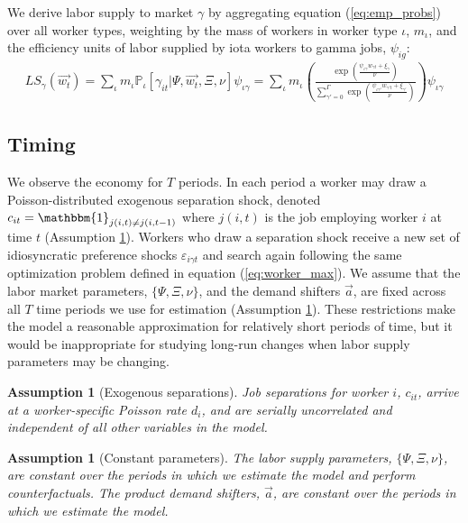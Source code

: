 \documentclass[12pt]{article}
\def\ig{\iota\gamma}
\def\g{\gamma}
\def\i{\iota}
\renewcommand{\P}{\mathbb {P}}
\theoremstyle{definition}
\theoremstyle{plain}
\newtheorem{assumption}[theorem]{Assumption}
\def\ve{\varepsilon}
\begin{document}
We derive labor supply to market $\g$ by aggregating equation (\ref{eq:emp_probs}) over all worker types, weighting by the mass of workers in worker type $\i$, $m_{\i}$, and the efficiency units of labor supplied by iota workers to gamma jobs, $\psi_{ig}$:
\begin{align}
LS_{\g}(\vec{w_t}) = \sum_{\i} m_{\i} \P_{\i}[\g_{it}|\Psi,\vec{w_t},\Xi,\nu] \psi_{\ig} = \sum_{\i} m_{\i} \left( \frac{\exp \left( \frac{\psi_{\ig} w_{\g t} + \xi_{\g}}{\nu} \right) }{ \sum\limits_{\g'=0}^{\Gamma} \exp \left( \frac{\psi_{\ig'} w_{\g' t} + \xi_{\g'}}{\nu} \right) } \right) \psi_{\ig} \label{eq:labor_supply}
\end{align}%


\subsection{Timing}

We observe the economy for $T$ periods.  In each period a worker may draw a Poisson-distributed exogenous separation shock, denoted $c_{it} = \mathbbm{1}_{j(i,t)\neq j(i,t-1)}$ where $j(i,t)$ is the job employing worker $i$ at time $t$ (Assumption \ref{ass:mobility}). Workers who draw a separation shock receive a new set of idiosyncratic preference shocks $\ve_{i\g t}$ and search again following the same optimization problem defined in equation (\ref{eq:worker_max}). We assume that the labor market parameters, $\{\Psi, \Xi, \nu\}$, and the demand shifters $\vec{a}$, are fixed across all $T$ time periods we use for estimation (Assumption \ref{ass:constant_parameters}). These restrictions make the model a reasonable approximation for relatively short periods of time, but it would be inappropriate for studying long-run changes when labor supply parameters may be changing.

\begin{assumption}[Exogenous separations]
	\label{ass:mobility}
	Job separations for worker $i$, $c_{it}$, arrive at a worker-specific Poisson rate $d_i$, and are serially uncorrelated and independent of all other variables in the model. 
\end{assumption}

\begin{assumption}[Constant parameters]
	\label{ass:constant_parameters}
	The labor supply parameters, $\{\Psi, \Xi, \nu\}$, are constant over the periods in which we estimate the model and perform counterfactuals. The product demand shifters, $\vec{a}$, are constant over the periods in which we estimate the model.
\end{assumption}
\end{document}
